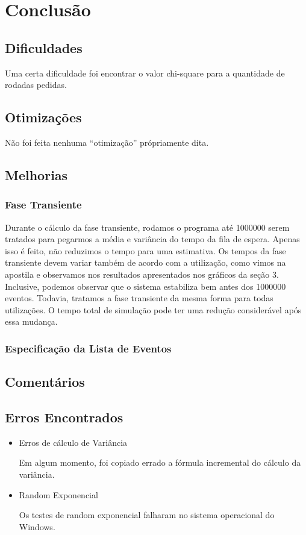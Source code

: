 \documentclass[a4paper]{article}
\begin{document}
\newpage
\section{Conclusão}
\subsection{Dificuldades}
Uma certa dificuldade foi encontrar o valor chi-square para a quantidade de rodadas pedidas.

\subsection{Otimizações}
Não foi feita nenhuma ``otimização'' própriamente dita.

\subsection{Melhorias}
\subsubsection{Fase Transiente}
Durante o cálculo da fase transiente,
rodamos o programa até 1000000 serem tratados
para pegarmos a média e variância do tempo da fila de espera.
Apenas isso é feito,
não reduzimos o tempo para uma estimativa.
Os tempos da fase transiente devem variar também de acordo
com a utilização,
como vimos na apostila e
observamos nos resultados apresentados nos gráficos da seção 3.
Inclusive, podemos observar que o sistema estabiliza
bem antes dos 1000000 eventos.
Todavia, tratamos a fase transiente da mesma forma
para todas utilizações.
O tempo total de simulação pode ter
uma redução considerável após essa mudança.

\subsubsection{Especificação da Lista de Eventos}

\subsection{Comentários}

\subsection{Erros Encontrados}
\begin{itemize}
    \item Erros de cálculo de Variância \par
        Em algum momento, foi copiado errado a fórmula incremental
        do cálculo da variância.
    \item Random Exponencial \par
    Os testes de random exponencial falharam no sistema operacional do Windows.
\end{itemize}
\end{document}
